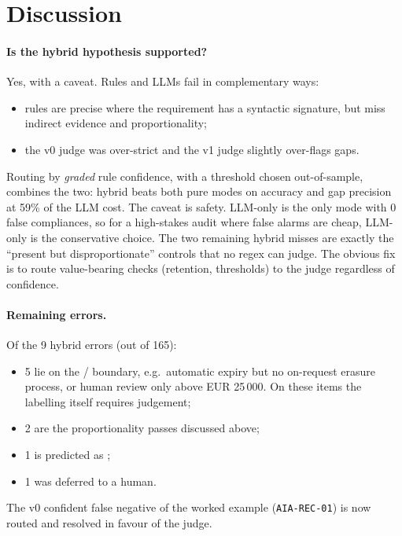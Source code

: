 \section{Discussion}
\label{section:discussion}

\paragraph{Is the hybrid hypothesis supported?} Yes, with a caveat. Rules and LLMs fail in complementary ways:
\begin{itemize}[leftmargin=*]
  \item rules are precise where the requirement has a syntactic signature, but miss indirect evidence and
        proportionality;
  \item the v0 judge was over-strict and the v1 judge slightly over-flags gaps.
\end{itemize}
Routing by \emph{graded} rule confidence, with a threshold chosen out-of-sample, combines the two: hybrid beats both
pure modes on accuracy and gap precision at 59\% of the LLM cost. The caveat is safety. LLM-only is the only mode with 0
false compliances, so for a high-stakes audit where false alarms are cheap, LLM-only is the conservative choice. The two
remaining hybrid misses are exactly the ``present but disproportionate'' controls that no regex can judge. The obvious
fix is to route value-bearing checks (retention, thresholds) to the judge regardless of confidence.

\paragraph{Remaining errors.} Of the 9 hybrid errors (out of 165):
\begin{itemize}[leftmargin=*]
  \item 5 lie on the / boundary, e.g.\ automatic expiry but no on-request erasure process, or human
        review only above EUR 25\,000. On these items the labelling itself requires judgement;
  \item 2 are the proportionality passes discussed above;
  \item 1 is  predicted as ;
  \item 1 was deferred to a human.
\end{itemize}
The v0 confident false negative of the worked example (\texttt{AIA-REC-01}) is now routed and resolved in favour of the
judge.

